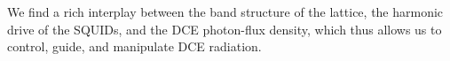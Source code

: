 We find a rich interplay between the band structure of the lattice, the harmonic drive of the SQUIDs, and the DCE photon-flux density, which thus allows us to control, guide, and manipulate DCE radiation. 
